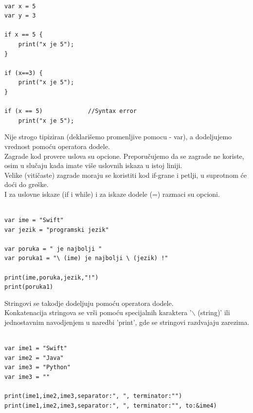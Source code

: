 \documentclass[a4paper]{article}
\begin{document}
\begin{lstlisting}[caption={},frame=single, label=simple]

var x = 5
var y = 3

if x == 5 {
	print("x je 5");
}

if (x==3) {
	print("x je 5");
}

if (x == 5)				//Syntax error
	print("x je 5");

\end{lstlisting}

Nije strogo tipiziran (deklarišemo promenljive pomocu - var), a dodeljujemo vrednost pomoću operatora dodele.\\
Zagrade kod provere uslova su opcione. Preporučujemo da se zagrade ne koriste, osim u slučaju kada imate više uslovnih iskaza u istoj liniji.\\
Velike (vitičaste) zagrade moraju se koristiti kod if-grane i petlji, u suprotnom će doći do greške.\\
I za uslovne iskaze (if i while) i za iskaze dodele (=) razmaci su opcioni.\\



\begin{lstlisting}[caption={},frame=single, label=simple]

var ime = "Swift"
var jezik = "programski jezik"

var poruka = " je najbolji "
var poruka1 = "\ (ime) je najbolji \ (jezik) !" 

print(ime,poruka,jezik,"!")
print(poruka1)

\end{lstlisting}

Stringovi se takodje dodeljuju pomoću operatora dodele.\\
Konkatenacija stringova se vrši pomoću specijalnih karaktera '$\backslash$ (string)' ili jednostavnim navodjenjem u naredbi 'print', gde se stringovi razdvajaju zarezima.\\



\begin{lstlisting}[caption={},frame=single, label=simple]

var ime1 = "Swift"
var ime2 = "Java"
var ime3 = "Python"
var ime3 = ""

print(ime1,ime2,ime3,separator:", ", terminator:"")
print(ime1,ime2,ime3,separator:", ", terminator:"", to:&ime4)

\end{lstlisting}
\end{document}
